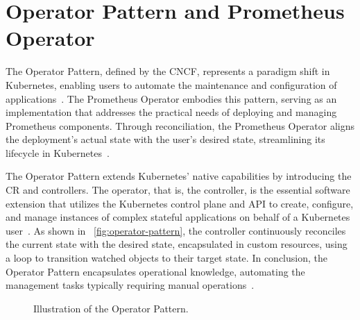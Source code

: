 \section{Operator Pattern and Prometheus Operator}

The Operator Pattern, defined by the \ac{CNCF}, represents a paradigm shift in Kubernetes, enabling users to automate the maintenance and configuration of applications~\parencite{kubernetesOperatorPattern}. The Prometheus Operator embodies this pattern, serving as an implementation that addresses the practical needs of deploying and managing Prometheus components. Through reconciliation, the Prometheus Operator aligns the deployment's actual state with the user's desired state, streamlining its lifecycle in Kubernetes~\parencite{prometheusoperatorIntroduction2020}.

The Operator Pattern extends Kubernetes' native capabilities by introducing the \ac{CR} and controllers. The operator, that is, the controller, is the essential software extension that utilizes the Kubernetes control plane and \ac{API} to create, configure, and manage instances of complex stateful applications on behalf of a Kubernetes user~\parencite{dobiesKubernetesOperators}. As shown in ~\autoref{fig:operator-pattern}, the controller continuously reconciles the current state with the desired state, encapsulated in custom resources, using a loop to transition watched objects to their target state. In conclusion, the Operator Pattern encapsulates operational knowledge, automating the management tasks typically requiring manual operations~\parencite{cncfCNCFOperatorWhite}. 

\begin{figure}[htpb]
    \centering
    \caption[Operator Pattern]{Illustration of the Operator Pattern.}\label{fig:operator-pattern}
\end{figure}

